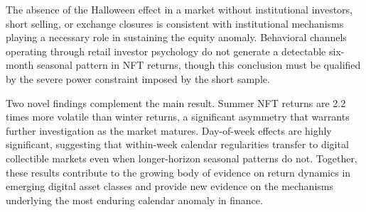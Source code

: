 \documentclass[12pt,a4paper]{article}
\begin{document}
The absence of the Halloween effect in a market without institutional investors, short selling, or exchange closures is consistent with institutional mechanisms playing a necessary role in sustaining the equity anomaly. Behavioral channels operating through retail investor psychology do not generate a detectable six-month seasonal pattern in NFT returns, though this conclusion must be qualified by the severe power constraint imposed by the short sample.

Two novel findings complement the main result. Summer NFT returns are 2.2 times more volatile than winter returns, a significant asymmetry that warrants further investigation as the market matures. Day-of-week effects are highly significant, suggesting that within-week calendar regularities transfer to digital collectible markets even when longer-horizon seasonal patterns do not. Together, these results contribute to the growing body of evidence on return dynamics in emerging digital asset classes and provide new evidence on the mechanisms underlying the most enduring calendar anomaly in finance.






\FloatBarrier



\end{document}
